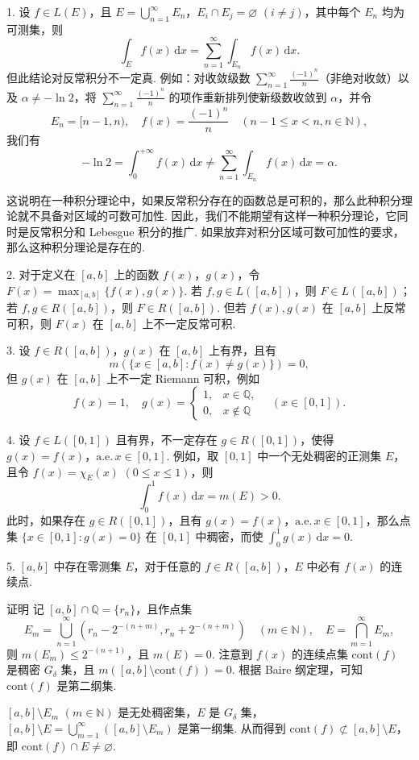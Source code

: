 \documentclass[../../main.tex]{subfiles}
\begin{document}
\begin{remark}
1. 设 \( f \in L(E) \)，且 \( E = \bigcup_{n = 1}^{\infty} E_n \)，\( E_i \cap E_j = \varnothing \) \( (i \neq j) \)，其中每个 \( E_n \) 均为可测集，则
\[
\int_E f(x) \, \mathrm{d}x = \sum_{n = 1}^{\infty} \int_{E_n} f(x) \, \mathrm{d}x.
\]
但此结论对反常积分不一定真. 例如：对收敛级数 \( \sum_{n = 1}^{\infty} \frac{(-1)^n}{n} \)（非绝对收敛）以及 \( \alpha \neq -\ln 2 \)，将 \( \sum_{n = 1}^{\infty} \frac{(-1)^n}{n} \) 的项作重新排列使新级数收敛到 \( \alpha \)，并令
\[
E_n = [n - 1, n), \quad f(x) = \frac{(-1)^n}{n} \quad (n - 1 \leq x < n, n \in \mathbb{N}),
\]
我们有
\[
-\ln 2 = \int_0^{+\infty} f(x) \, \mathrm{d}x \neq \sum_{n = 1}^{\infty} \int_{E_n} f(x) \, \mathrm{d}x = \alpha.
\]

这说明在一种积分理论中，如果反常积分存在的函数总是可积的，那么此种积分理论就不具备对区域的可数可加性. 因此，我们不能期望有这样一种积分理论，它同时是反常积分和 Lebesgue 积分的推广. 如果放弃对积分区域可数可加性的要求，那么这种积分理论是存在的.

2. 对于定义在 \( [a, b] \) 上的函数 \( f(x) \)，\( g(x) \)，令 \( F(x) = \max_{[a, b]} \{ f(x), g(x) \} \). 若 \( f, g \in L([a, b]) \)，则 \( F \in L([a, b]) \)；若 \( f, g \in R([a, b]) \)，则 \( F \in R([a, b]) \). 但若 \( f(x), g(x) \) 在 \( [a, b] \) 上反常可积，则 \( F(x) \) 在 \( [a, b] \) 上不一定反常可积.

3. 设 \( f \in R([a, b]) \)，\( g(x) \) 在 \( [a, b] \) 上有界，且有
\[
m(\{ x \in [a, b] : f(x) \neq g(x) \}) = 0,
\]
但 \( g(x) \) 在 \( [a, b] \) 上不一定 Riemann 可积，例如
\[
f(x) = 1, \quad g(x) = 
\begin{cases} 
1, & x \in \mathbb{Q}, \\
0, & x \notin \mathbb{Q}
\end{cases} \quad (x \in [0, 1]).
\]

4. 设 \( f \in L([0, 1]) \) 且有界，不一定存在 \( g \in R([0, 1]) \)，使得 \( g(x) = f(x) \)，\(\text{a.e.}\, x \in [0, 1] \). 例如，取 \( [0, 1] \) 中一个无处稠密的正测集 \( E \)，且令 \( f(x) = \chi_E(x) \) \( (0 \leq x \leq 1) \)，则
\[
\int_0^1 f(x) \, \mathrm{d}x = m(E) > 0.
\]
此时，如果存在 \( g \in R([0, 1]) \)，且有 \( g(x) = f(x) \)，\(\text{a.e.}\, x \in [0, 1] \)，那么点集 \( \{ x \in [0, 1] : g(x) = 0 \} \) 在 \( [0, 1] \) 中稠密，而使 \( \int_0^1 g(x) \, \mathrm{d}x = 0 \).

5. \( [a, b] \) 中存在零测集 \( E \)，对于任意的 \( f \in R([a, b]) \)，\( E \) 中必有 \( f(x) \) 的连续点.

证明 记 \( [a, b] \cap \mathbb{Q} = \{ r_n \} \)，且作点集
\[
E_m = \bigcup_{n = 1}^{\infty} \left( r_n - 2^{-(n + m)}, r_n + 2^{-(n + m)} \right) \quad (m \in \mathbb{N}), \quad E = \bigcap_{m = 1}^{\infty} E_m,
\]
则 \( m(E_m) \leq 2^{-(n + 1)} \)，且 \( m(E) = 0 \). 注意到 \( f(x) \) 的连续点集 \( \mathrm{cont}(f) \) 是稠密 \( G_{\delta} \) 集，且 \( m([a, b] \setminus \mathrm{cont}(f)) = 0 \). 根据 Baire 纲定理，可知 \( \mathrm{cont}(f) \) 是第二纲集.

\( [a, b] \setminus E_m \) \( (m \in \mathbb{N}) \) 是无处稠密集，\( E \) 是 \( G_{\delta} \) 集，\( [a, b] \setminus E = \bigcup_{m = 1}^{\infty} ([a, b] \setminus E_m) \) 是第一纲集. 从而得到 \( \mathrm{cont}(f) \not\subset [a, b] \setminus E \)，即 \( \mathrm{cont}(f) \cap E \neq \varnothing \).
\end{remark}
\end{document}
